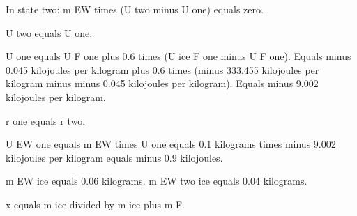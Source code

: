In state two:  
m EW times (U two minus U one) equals zero.  

U two equals U one.  

U one equals U F one plus 0.6 times (U ice F one minus U F one).  
Equals minus 0.045 kilojoules per kilogram plus 0.6 times (minus 333.455 kilojoules per kilogram minus minus 0.045 kilojoules per kilogram).  
Equals minus 9.002 kilojoules per kilogram.  

r one equals r two.  

U EW one equals m EW times U one equals 0.1 kilograms times minus 9.002 kilojoules per kilogram equals minus 0.9 kilojoules.  

m EW ice equals 0.06 kilograms.  
m EW two ice equals 0.04 kilograms.  

x equals m ice divided by m ice plus m F.